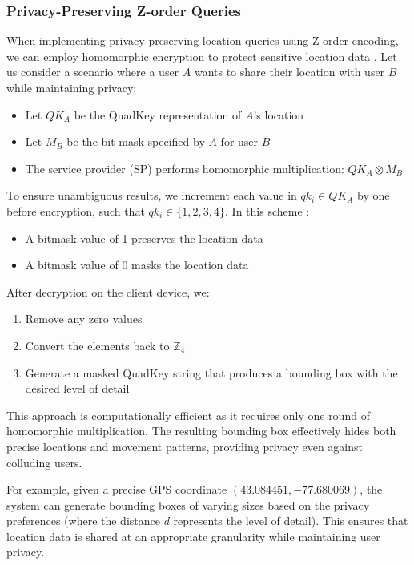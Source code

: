 \subsubsection{Privacy-Preserving Z-order Queries} \label{sec:privacy-preserving-z-order}

When implementing privacy-preserving location queries using Z-order encoding, we can employ homomorphic encryption to protect sensitive location data \cite{zhang2020privacy}. Let us consider a scenario where a user \( A \) wants to share their location with user \( B \) while maintaining privacy:

\begin{itemize}
    \item Let \( QK_A \) be the QuadKey representation of \( A \)'s location
    \item Let \( M_B \) be the bit mask specified by \( A \) for user \( B \)
    \item The service provider (SP) performs homomorphic multiplication: \( QK_A \otimes M_B \)
\end{itemize}

To ensure unambiguous results, we increment each value in \( qk_i \in QK_A \) by one before encryption, such that \( qk_i \in \{1,2,3,4\} \). In this scheme \cite{zhang2020privacy}:
\begin{itemize}
    \item A bitmask value of 1 preserves the location data
    \item A bitmask value of 0 masks the location data
\end{itemize}

After decryption on the client device, we:
\begin{enumerate}
    \item Remove any zero values
    \item Convert the elements back to \( \mathbb{Z}_4 \)
    \item Generate a masked QuadKey string that produces a bounding box with the desired level of detail
\end{enumerate}

This approach is computationally efficient as it requires only one round of homomorphic multiplication. The resulting bounding box effectively hides both precise locations and movement patterns, providing privacy even against colluding users.

For example, given a precise GPS coordinate \( (43.084451, -77.680069) \), the system can generate bounding boxes of varying sizes based on the privacy preferences (where the distance \( d \) represents the level of detail). This ensures that location data is shared at an appropriate granularity while maintaining user privacy.

